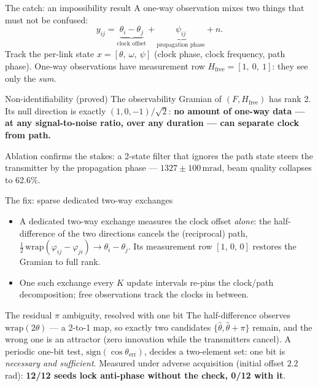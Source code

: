 \documentclass[aspectratio=169,10pt]{beamer}
\newcommand{\mrad}{\,\mathrm{mrad}}
\begin{document}
\begin{frame}{The catch: an impossibility result}
  A one-way observation mixes two things that must not be confused:
  \[
    y_{ij} = \underbrace{\theta_i - \theta_j}_{\text{clock offset}}
           + \underbrace{\psi_{ij}}_{\text{propagation phase}} + n .
  \]
  Track the per-link state $x = [\theta,\ \omega,\ \psi]$
  (clock phase, clock frequency, path phase). One-way observations
  have measurement row $H_{\mathrm{free}} = [1,\ 0,\ 1]$: they see
  only the \emph{sum}.
  \begin{block}{Non-identifiability (proved)}
    The observability Gramian of $(F, H_{\mathrm{free}})$ has rank 2.
    Its null direction is exactly $(1, 0, -1)/\sqrt{2}$: \textbf{no
    amount of one-way data --- at any signal-to-noise ratio, over any
    duration --- can separate clock from path.}
  \end{block}
  Ablation confirms the stakes: a 2-state filter that ignores the path
  state steers the transmitter by the propagation phase ---
  $1327 \pm 100\mrad$, beam quality collapses to 62.6\%.
\end{frame}

\begin{frame}{The fix: sparse dedicated two-way exchanges}
  \begin{itemize}
    \item A dedicated two-way exchange measures the clock offset
          \emph{alone}: the half-difference of the two directions
          cancels the (reciprocal) path,
          $\tfrac12\,\mathrm{wrap}(\varphi_{ij}-\varphi_{ji}) \to
          \theta_i-\theta_j$. Its measurement row $[1,\,0,\,0]$
          restores the Gramian to full rank.
    \item One such exchange every $K$ update intervals re-pins the
          clock/path decomposition; free observations track the clocks
          in between.
  \end{itemize}
  \begin{block}{The residual $\pi$ ambiguity, resolved with one bit}
    The half-difference observes $\mathrm{wrap}(2\theta)$ --- a 2-to-1
    map, so exactly two candidates $\{\hat\theta, \hat\theta+\pi\}$
    remain, and the wrong one is an attractor (zero innovation while
    the transmitters cancel). A periodic one-bit test,
    $\mathrm{sign}(\cos\theta_{\mathrm{err}})$, decides a two-element
    set: one bit is \emph{necessary and sufficient}. Measured under
    adverse acquisition (initial offset $2.2$\,rad): \textbf{12/12
    seeds lock anti-phase without the check, 0/12 with it}.
  \end{block}
\end{frame}
\end{document}
